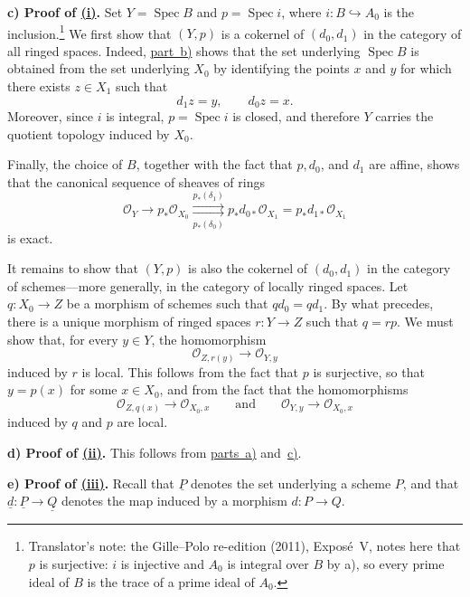 
\medskip
{}\label{proof:sga3-V-4.1-c}%
\noindent\textbf{c) Proof of \hyperref[thm:sga3-V-4.1-i]{(i)}.}
Set \(Y=\operatorname{Spec}B\) and \(p=\operatorname{Spec}i\), where
\(i:B\hookrightarrow A_0\) is the inclusion.\footnote{Translator's note: the Gille--Polo re-edition (2011), Exposé~V, notes
here that \(p\) is surjective: \(i\) is injective and \(A_0\) is integral over
\(B\) by a), so every prime ideal of \(B\) is the trace of a prime ideal of
\(A_0\).} We first show that \((Y,p)\) is a
cokernel of \((d_0,d_1)\) in the category of all ringed spaces.
Indeed, \hyperref[proof:sga3-V-4.1-b]{part~b)} shows that the set underlying \(\operatorname{Spec}B\)
is obtained from the set underlying \(X_0\) by identifying the points
\(x\) and \(y\) for which there exists \(z\in X_1\) such that
\[
  d_1z=y,\qquad d_0z=x.
\]
Moreover, since \(i\) is integral, \(p=\operatorname{Spec}i\) is
closed, and therefore \(Y\) carries the quotient topology induced by
\(X_0\).

Finally, the choice of \(B\), together with the fact that \(p,d_0\),
and \(d_1\) are affine, shows that the canonical sequence of sheaves
of rings
\[
  \mathcal O_Y\longrightarrow p_\ast\mathcal O_{X_0}
  \underset{p_\ast(\delta_0)}{\overset{p_\ast(\delta_1)}
    {\rightrightarrows}}
  p_\ast d_{0\ast}\mathcal O_{X_1}
  =p_\ast d_{1\ast}\mathcal O_{X_1}
\]
is exact.

It remains to show that \((Y,p)\) is also the cokernel of
\((d_0,d_1)\) in the category of schemes---more generally, in the
category of locally ringed spaces. Let \(q:X_0\to Z\) be a morphism of
schemes such that \(qd_0=qd_1\). By what precedes, there is a unique
morphism of ringed spaces \(r:Y\to Z\) such that \(q=rp\). We must
show that, for every \(y\in Y\), the homomorphism
\[
  \mathcal O_{Z,r(y)}\longrightarrow\mathcal O_{Y,y}
\]
induced by \(r\) is local. This follows from the fact that \(p\) is
surjective, so that \(y=p(x)\) for some \(x\in X_0\), and from the fact
that the homomorphisms
\[
  \mathcal O_{Z,q(x)}\longrightarrow\mathcal O_{X_0,x}
  \qquad\text{and}\qquad
  \mathcal O_{Y,y}\longrightarrow\mathcal O_{X_0,x}
\]
induced by \(q\) and \(p\) are local.

\medskip
{}\label{proof:sga3-V-4.1-d}%
\noindent\textbf{d) Proof of \hyperref[thm:sga3-V-4.1-ii]{(ii)}.}
This follows from \hyperref[proof:sga3-V-4.1-a]{parts~a)} and~\hyperref[proof:sga3-V-4.1-c]{c)}.

\medskip
{}\label{proof:sga3-V-4.1-e}%
\noindent\textbf{e) Proof of \hyperref[thm:sga3-V-4.1-iii]{(iii)}.}
Recall that \(\underline P\) denotes the set underlying a scheme
\(P\), and that \(\underline d:\underline P\to\underline Q\) denotes
the map induced by a morphism \(d:P\to Q\).

